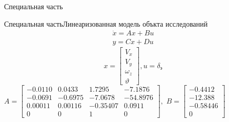 
\begin{frame}{Специальная часть}
\end{frame}
\begin{frame}{Специальная часть}{Линеаризованная модель объкта исследований}
    \begin{equation} \begin{aligned} \dot{x} = Ax+Bu \\ 
    y = Cx + Du \end{aligned} \end{equation}
$$x = \begin{bmatrix}
        V_x\\ 
        V_y\\ 
        \omega_z\\ 
        \vartheta
    \end{bmatrix},
u = \delta_\text{э}$$
   $ A = \begin{bmatrix}
        -0.0110 & 0.0433 & 1.7295 & -7.1876\\ 
        -0.0691 & -0.6975 & -7.0678 & -54.8976\\ 
        0.00011 & 0.00116 & -0.35407 & 0.0911\\ 
        0 & 0 & 1 & 0
    \end{bmatrix} ,$  
        $B = \begin{bmatrix}
        -0.4412\\ 
        -12.388\\ 
        -0.58446 \\ 
        0
    \end{bmatrix}$  
\end{frame}


